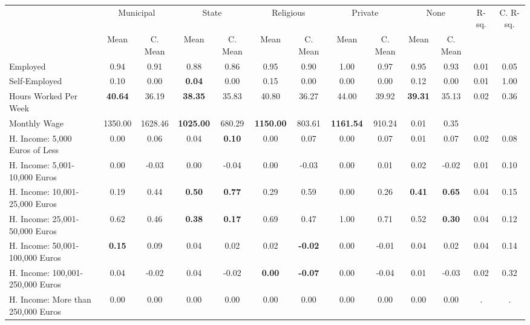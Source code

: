 \begin{tabular}{l c c c c c c c c c c c c}
\toprule
& \multicolumn{2}{c}{Municipal} & \multicolumn{2}{c}{State} & \multicolumn{2}{c}{Religious} & \multicolumn{2}{c}{Private} & \multicolumn{2}{c}{None} & R-sq. & C. R-sq. \\
& \scriptsize Mean & \scriptsize C. Mean & \scriptsize Mean & \scriptsize C. Mean & \scriptsize Mean & \scriptsize C. Mean & \scriptsize Mean & \scriptsize C. Mean & \scriptsize Mean & \scriptsize C. Mean & & \\
\midrule
Employed &      0.94 & 0.91 &      0.88 & 0.86 &      0.95 & 0.90 &      1.00 & 0.97 &      0.95 & 0.93 &      0.01 &      0.05 \\
Self-Employed &      0.10 & 0.00 & \textbf{     0.04} & 0.00 &      0.15 & 0.00 &      0.00 & 0.00 &      0.12 & 0.00 &      0.01 &      1.00 \\
Hours Worked Per Week & \textbf{    40.64} & 36.19 & \textbf{    38.35} & 35.83 &     40.80 & 36.27 &     44.00 & 39.92 & \textbf{    39.31} & 35.13 &      0.02 &      0.36 \\
Monthly Wage &   1350.00 & 1628.46 & \textbf{  1025.00} & 680.29 & \textbf{  1150.00} & 803.61 & \textbf{  1161.54} & 910.24 &      0.01 &      0.35 \\
H. Income: 5,000 Euros of Less &      0.00 & 0.06 &      0.04 & \textbf{     0.10} &      0.00 & 0.07 &      0.00 & 0.07 &      0.01 & 0.07 &      0.02 &      0.08 \\
H. Income: 5,001-10,000 Euros &      0.00 & -0.03 &      0.00 & -0.04 &      0.00 & -0.03 &      0.00 & 0.01 &      0.02 & -0.02 &      0.01 &      0.10 \\
H. Income: 10,001-25,000 Euros &      0.19 & 0.44 & \textbf{     0.50} & \textbf{     0.77} &      0.29 & 0.59 &      0.00 & 0.26 & \textbf{     0.41} & \textbf{     0.65} &      0.04 &      0.15 \\
H. Income: 25,001-50,000 Euros &      0.62 & 0.46 & \textbf{     0.38} & \textbf{     0.17} &      0.69 & 0.47 &      1.00 & 0.71 &      0.52 & \textbf{     0.30} &      0.04 &      0.12 \\
H. Income: 50,001-100,000 Euros & \textbf{     0.15} & 0.09 &      0.04 & 0.02 &      0.02 & \textbf{    -0.02} &      0.00 & -0.01 &      0.04 & 0.02 &      0.04 &      0.14 \\
H. Income: 100,001-250,000 Euros &      0.04 & -0.02 &      0.04 & -0.02 & \textbf{     0.00} & \textbf{    -0.07} &      0.00 & -0.04 &      0.01 & -0.03 &      0.02 &      0.32 \\
H. Income: More than 250,000 Euros &      0.00 & 0.00 &      0.00 & 0.00 &      0.00 & 0.00 &      0.00 & 0.00 &      0.00 & 0.00 &         . &         . \\
\bottomrule
\end{tabular}
